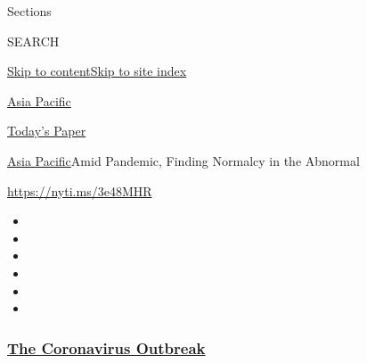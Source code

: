 Sections

SEARCH

\protect\hyperlink{site-content}{Skip to
content}\protect\hyperlink{site-index}{Skip to site index}

\href{https://www.nytimes3xbfgragh.onion/section/world/asia}{Asia
Pacific}

\href{https://myaccount.nytimes3xbfgragh.onion/auth/login?response_type=cookie\&client_id=vi}{}

\href{https://www.nytimes3xbfgragh.onion/section/todayspaper}{Today's
Paper}

\href{/section/world/asia}{Asia Pacific}\textbar{}Amid Pandemic, Finding
Normalcy in the Abnormal

\url{https://nyti.ms/3e48MHR}

\begin{itemize}
\item
\item
\item
\item
\item
\item
\end{itemize}

\hypertarget{the-coronavirus-outbreak}{%
\subsubsection{\texorpdfstring{\href{https://www.nytimes3xbfgragh.onion/news-event/coronavirus?name=styln-coronavirus-national\&region=TOP_BANNER\&variant=undefined\&block=storyline_menu_recirc\&action=click\&pgtype=Article\&impression_id=01b0b860-e3a1-11ea-8b08-6ddcf202df60}{The
Coronavirus
Outbreak}}{The Coronavirus Outbreak}}\label{the-coronavirus-outbreak}}

